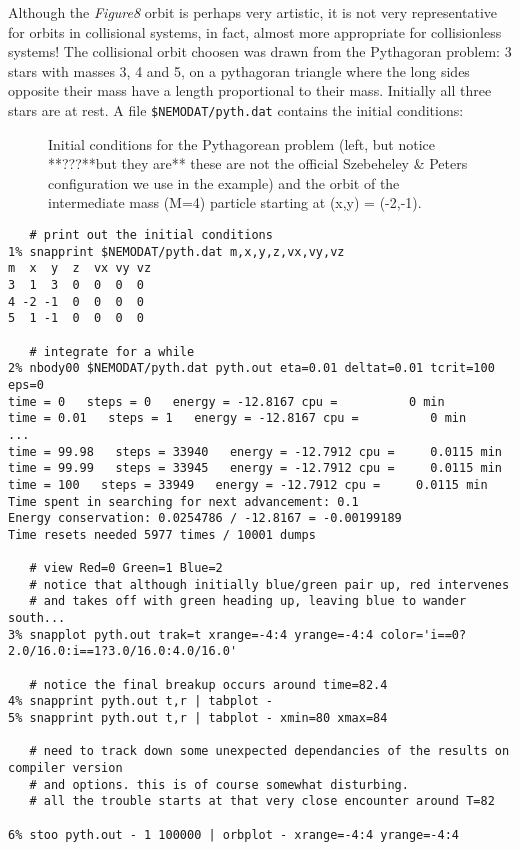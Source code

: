 Although the {\it Figure8} orbit is perhaps very artistic, it is not very representative
for orbits in collisional systems, in fact, almost more appropriate
for collisionless systems!
The collisional orbit choosen was drawn from the Pythagoran problem:
3 stars with masses 3, 4 and 5, on a pythagoran triangle where the
long sides opposite their mass have a length proportional to 
their mass. Initially
all three stars are at rest. A file {\tt \$NEMODAT/pyth.dat} contains
the initial conditions:


\begin{figure}[t]
\caption[Pythagorean problem]
{Initial conditions for the Pythagorean problem (left, but notice **???**but they are**
these are not the official Szebeheley \& Peters configuration we use
in the example)
and the orbit of the intermediate mass (M=4) particle starting
at (x,y) = (-2,-1).}
\end{figure}



\footnotesize\begin{verbatim}
   # print out the initial conditions
1% snapprint $NEMODAT/pyth.dat m,x,y,z,vx,vy,vz
m  x  y  z  vx vy vz
3  1  3  0  0  0  0
4 -2 -1  0  0  0  0
5  1 -1  0  0  0  0

   # integrate for a while
2% nbody00 $NEMODAT/pyth.dat pyth.out eta=0.01 deltat=0.01 tcrit=100 eps=0 
time = 0   steps = 0   energy = -12.8167 cpu =          0 min
time = 0.01   steps = 1   energy = -12.8167 cpu =          0 min
...
time = 99.98   steps = 33940   energy = -12.7912 cpu =     0.0115 min
time = 99.99   steps = 33945   energy = -12.7912 cpu =     0.0115 min
time = 100   steps = 33949   energy = -12.7912 cpu =     0.0115 min
Time spent in searching for next advancement: 0.1
Energy conservation: 0.0254786 / -12.8167 = -0.00199189
Time resets needed 5977 times / 10001 dumps

   # view Red=0 Green=1 Blue=2
   # notice that although initially blue/green pair up, red intervenes
   # and takes off with green heading up, leaving blue to wander south...
3% snapplot pyth.out trak=t xrange=-4:4 yrange=-4:4 color='i==0?2.0/16.0:i==1?3.0/16.0:4.0/16.0'

   # notice the final breakup occurs around time=82.4
4% snapprint pyth.out t,r | tabplot -
5% snapprint pyth.out t,r | tabplot - xmin=80 xmax=84

   # need to track down some unexpected dependancies of the results on compiler version
   # and options. this is of course somewhat disturbing.
   # all the trouble starts at that very close encounter around T=82

6% stoo pyth.out - 1 100000 | orbplot - xrange=-4:4 yrange=-4:4 
\end{verbatim}\normalsize

